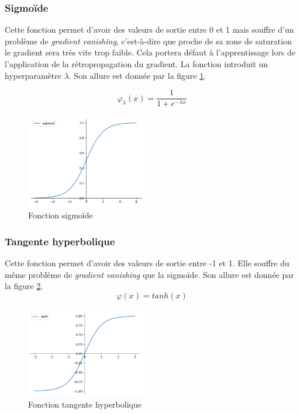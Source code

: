 \subsubsection{Sigmoïde}
Cette fonction permet d'avoir des valeurs de sortie entre 0 et 1 mais souffre d'un problème de \textit{gradient vanishing}, c'est-à-dire que proche de sa zone de saturation le gradient sera très vite trop faible. Cela portera défaut à l'apprentissage lors de l'application de la rétropropagation du gradient. La fonction introduit un hyperparamètre $\lambda$. Son allure est donnée par la figure \ref{sigmoide}.

\begin{displaymath}
\varphi_\lambda (x) = \frac{1}{1+e^{-\lambda x}}
\end{displaymath}

\begin{figure}[!h]
\centering
\includegraphics[width=150pt]{"images/MLP/sigmoide2"}
\caption{Fonction sigmoïde\\}
\label{sigmoide}
\end{figure}


\subsubsection{Tangente hyperbolique}
Cette fonction permet d'avoir des valeurs de sortie entre -1 et 1. Elle souffre du même problème de \textit{gradient vanishing} que la sigmoïde. Son allure est donnée par la figure \ref{tanh}.
\begin{displaymath}
\varphi (x) = tanh(x)
\end{displaymath}

\begin{figure}[!h]
\centering
\includegraphics[width=150pt]{"images/MLP/tanh2"}
\caption{Fonction tangente hyperbolique\\ }
\label{tanh}
\end{figure}


